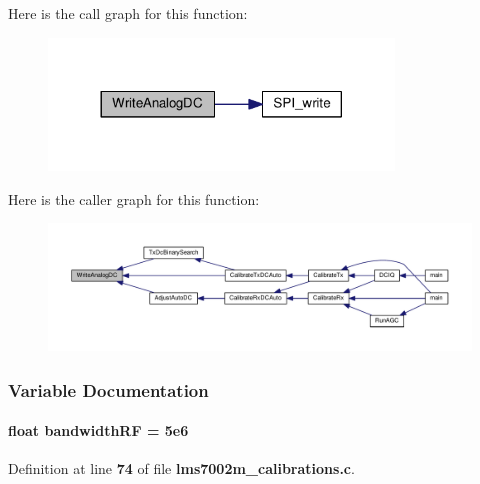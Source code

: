 Here is the call graph for this function\+:
\nopagebreak
\begin{figure}[H]
\begin{center}
\leavevmode
\includegraphics[width=260pt]{d3/dec/lms7002m__calibrations_8c_a7c0cbbebceb2e3721786e9d65a5d76e9_cgraph}
\end{center}
\end{figure}




Here is the caller graph for this function\+:
\nopagebreak
\begin{figure}[H]
\begin{center}
\leavevmode
\includegraphics[width=350pt]{d3/dec/lms7002m__calibrations_8c_a7c0cbbebceb2e3721786e9d65a5d76e9_icgraph}
\end{center}
\end{figure}




\subsubsection{Variable Documentation}
\paragraph[{bandwidth\+RF}]{\setlength{\rightskip}{0pt plus 5cm}float bandwidth\+RF = 5e6}\label{lms7002m__calibrations_8c_a2ebcd4609895042a2ee1e80a6644de70}


Definition at line {\bf 74} of file {\bf lms7002m\+\_\+calibrations.\+c}.



